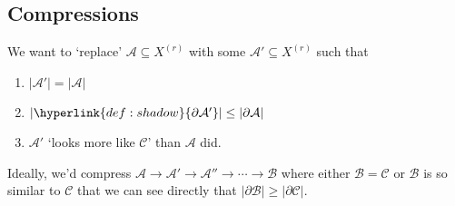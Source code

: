 \documentclass{article}
\let\subset\subseteq
\begin{document}
\subsection{Compressions}
\begin{idea}
We want to `replace' $\mathcal{A} \subset X^{(r)}$ with some $\mathcal{A}' \subset X^{(r)}$ such that
\begin{enumerate}[label=(\roman*)]
  \item $|\mathcal{A}'| = |\mathcal{A}|$
  \item $|\hyperlink{def:shadow}{\partial \mathcal{A}'}| \leq |\partial \mathcal{A}|$
  \item $\mathcal{A}'$ `looks more like $\mathcal{C}$' than $\mathcal{A}$ did.
\end{enumerate}
Ideally, we'd compress $\mathcal{A} \to \mathcal{A}' \to \mathcal{A}'' \to \dotsm \to \mathcal{B}$ where either $\mathcal{B} = \mathcal{C}$ or $\mathcal{B}$ is so similar to $\mathcal{C}$ that we can see directly that $|\partial \mathcal{B}| \geq |\partial \mathcal{C}|$.
\end{idea}
\end{document}
